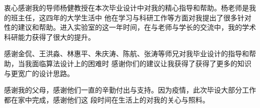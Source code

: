 \begin{acknowledgement}
  衷心感谢我的导师杨健教授在本次毕业设计中对我的精心指导和帮助。杨老师是我的班主任，这四年的大学生活中
  他在学习与科研工作等方面对我提出了很多针对性的建议和帮助。进入实验室的这一年时间，在与老师与学长的交流中，我的学术
  科研能力获得了很大的提升。

  感谢金侃、王洪淼、林惠平、朱庆涛、陈航、张涛等师兄对我毕业设计的指导和帮助，当我面临算法设计上的困难时
  感谢你们的建议让我获得了获得了更多的知识与更宽广的设计思路。

  感谢我的父母，感谢他们一直的辛勤付出与支持。因为疫情，此次毕设大部分工作都在家中完成，感谢他们这
  段时间在生活上的对我的关心与照料。

\end{acknowledgement}

